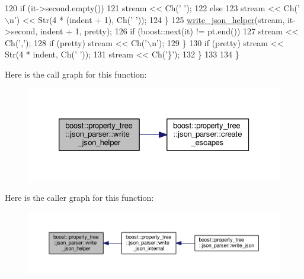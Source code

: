 \begin{DoxyCode}
120         \textcolor{keywordflow}{if} (it->second.empty())
121           stream << Ch(\textcolor{charliteral}{' '});
122         \textcolor{keywordflow}{else}
123           stream << Ch(\textcolor{charliteral}{'\(\backslash\)n'}) << Str(4 * (indent + 1), Ch(\textcolor{charliteral}{' '}));
124       \}
125       \hyperlink{namespaceboost_1_1property__tree_1_1json__parser_a133973ddea67e6d77424312cd297b332}{write\_json\_helper}(stream, it->second, indent + 1, pretty);
126       \textcolor{keywordflow}{if} (boost::next(it) != pt.end())
127         stream << Ch(\textcolor{charliteral}{','});
128       \textcolor{keywordflow}{if} (pretty) stream << Ch(\textcolor{charliteral}{'\(\backslash\)n'});
129     \}
130     \textcolor{keywordflow}{if} (pretty) stream << Str(4 * indent, Ch(\textcolor{charliteral}{' '}));
131     stream << Ch(\textcolor{charliteral}{'\}'});
132   \}
133 
134 \}
\end{DoxyCode}


Here is the call graph for this function\-:
\nopagebreak
\begin{figure}[H]
\begin{center}
\leavevmode
\includegraphics[width=326pt]{namespaceboost_1_1property__tree_1_1json__parser_a133973ddea67e6d77424312cd297b332_cgraph}
\end{center}
\end{figure}




Here is the caller graph for this function\-:
\nopagebreak
\begin{figure}[H]
\begin{center}
\leavevmode
\includegraphics[width=350pt]{namespaceboost_1_1property__tree_1_1json__parser_a133973ddea67e6d77424312cd297b332_icgraph}
\end{center}
\end{figure}


